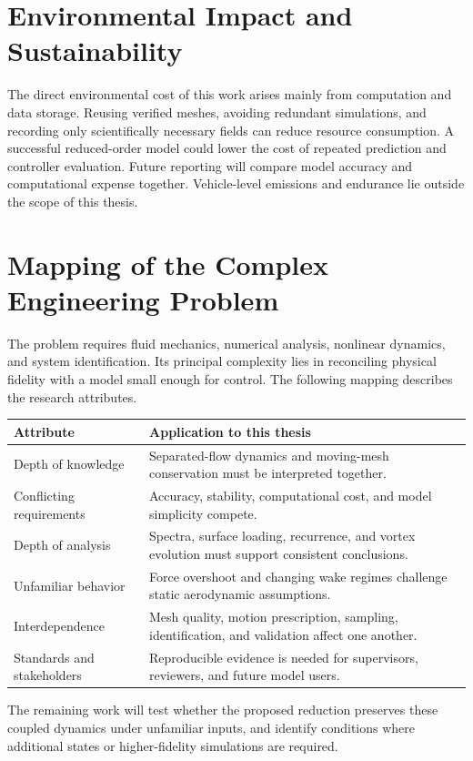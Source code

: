 \section{Environmental Impact and Sustainability}
The direct environmental cost of this work arises mainly from computation and data storage. Reusing verified meshes, avoiding redundant simulations, and recording only scientifically necessary fields can reduce resource consumption. A successful reduced-order model could lower the cost of repeated prediction and controller evaluation. Future reporting will compare model accuracy and computational expense together. Vehicle-level emissions and endurance lie outside the scope of this thesis.

\section{Mapping of the Complex Engineering Problem}
The problem requires fluid mechanics, numerical analysis, nonlinear dynamics, and system identification. Its principal complexity lies in reconciling physical fidelity with a model small enough for control. The following mapping describes the research attributes.

\begin{center}\small
\begin{tabularx}{\linewidth}{@{}p{.27\linewidth}X@{}}
\toprule
Attribute & Application to this thesis \\
\midrule
Depth of knowledge & Separated-flow dynamics and moving-mesh conservation must be interpreted together. \\
Conflicting requirements & Accuracy, stability, computational cost, and model simplicity compete. \\
Depth of analysis & Spectra, surface loading, recurrence, and vortex evolution must support consistent conclusions. \\
Unfamiliar behavior & Force overshoot and changing wake regimes challenge static aerodynamic assumptions. \\
Interdependence & Mesh quality, motion prescription, sampling, identification, and validation affect one another. \\
Standards and stakeholders & Reproducible evidence is needed for supervisors, reviewers, and future model users. \\
\bottomrule
\end{tabularx}\end{center}

The remaining work will test whether the proposed reduction preserves these coupled dynamics under unfamiliar inputs, and identify conditions where additional states or higher-fidelity simulations are required.


